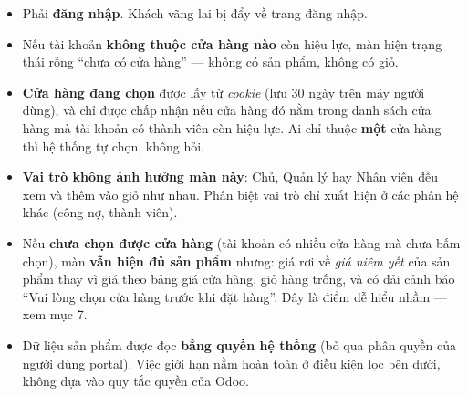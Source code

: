 \mai

\begin{itemize}[leftmargin=*]
  \item Phải \textbf{đăng nhập}. Khách vãng lai bị đẩy về trang đăng nhập.
  \item Nếu tài khoản \textbf{không thuộc cửa hàng nào} còn hiệu lực, màn hiện trạng thái rỗng
        ``chưa có cửa hàng'' --- không có sản phẩm, không có giỏ.
  \item \textbf{Cửa hàng đang chọn} được lấy từ \emph{cookie} 
        (lưu 30 ngày trên máy người dùng), và chỉ được chấp nhận nếu cửa hàng đó nằm trong danh
        sách cửa hàng mà tài khoản có thành viên còn hiệu lực. Ai chỉ thuộc \textbf{một} cửa
        hàng thì hệ thống tự chọn, không hỏi.
  \item \textbf{Vai trò không ảnh hưởng màn này}: Chủ, Quản lý hay Nhân viên đều xem và thêm vào
        giỏ như nhau. Phân biệt vai trò chỉ xuất hiện ở các phân hệ khác (công nợ, thành viên).
  \item Nếu \textbf{chưa chọn được cửa hàng} (tài khoản có nhiều cửa hàng mà chưa bấm chọn),
        màn \textbf{vẫn hiện đủ sản phẩm} nhưng: giá rơi về \emph{giá niêm yết} của sản phẩm
        thay vì giá theo bảng giá cửa hàng, giỏ hàng trống, và có dải cảnh báo
        ``Vui lòng chọn cửa hàng trước khi đặt hàng''. Đây là điểm dễ hiểu nhầm --- xem mục 7.
  \item Dữ liệu sản phẩm được đọc \textbf{bằng quyền hệ thống} (bỏ qua phân quyền của người
        dùng portal). Việc giới hạn nằm hoàn toàn ở điều kiện lọc bên dưới, không dựa vào
        quy tắc quyền của Odoo.
\end{itemize}

\mhien

